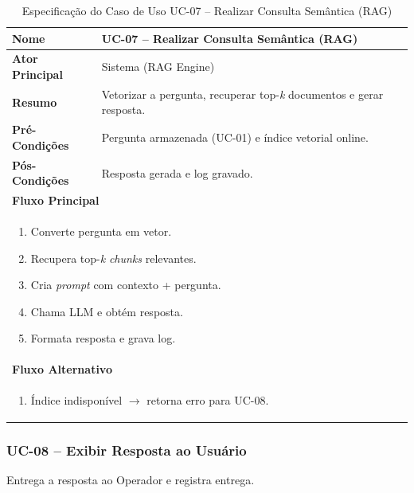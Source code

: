 \begin{table}[H]
\centering
\caption{Especificação do Caso de Uso UC-07 – Realizar Consulta Semântica (RAG)}
\label{tab:uc07}
\begin{tabular}{|p{4cm}|p{11cm}|}
\hline
\textbf{Nome}        & UC-07 – Realizar Consulta Semântica (RAG) \\ \hline
\textbf{Ator Principal} & Sistema (RAG Engine) \\ \hline
\textbf{Resumo}      & Vetorizar a pergunta, recuperar top-\emph{k} documentos e gerar resposta. \\ \hline
\textbf{Pré-Condições} & Pergunta armazenada (UC-01) e índice vetorial online. \\ \hline
\textbf{Pós-Condições} & Resposta gerada e log gravado. \\ \hline
\multicolumn{2}{|l|}{\textbf{Fluxo Principal}} \\ \hline
\multicolumn{2}{|p{15cm}|}{%
\begin{enumerate}[leftmargin=*]
  \item Converte pergunta em vetor.
  \item Recupera top-\emph{k} \textit{chunks} relevantes.
  \item Cria \emph{prompt} com contexto + pergunta.
  \item Chama LLM e obtém resposta.
  \item Formata resposta e grava log.
\end{enumerate}} \\ \hline
\multicolumn{2}{|l|}{\textbf{Fluxo Alternativo}} \\ \hline
\multicolumn{2}{|p{15cm}|}{%
\begin{enumerate}[label=\arabic*a.,leftmargin=*]
  \item Índice indisponível $\rightarrow$ retorna erro para UC-08.
\end{enumerate}} \\ \hline
\end{tabular}
\end{table}

\subsubsection{UC-08 – Exibir Resposta ao Usuário}

\noindent
Entrega a resposta ao Operador e registra entrega.

